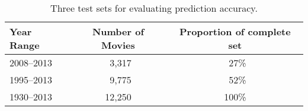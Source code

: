 \begin{table}[!ht]
\centering
\caption{\label{tab:test_sets}Three test sets for evaluating prediction accuracy.}
\begin{tabular}{@{}lcc@{}}
\toprule
Year Range & Number of Movies & Proportion of complete set \\
\midrule
2008--2013     &~3,317 &~27\% \\
1995--2013     &~9,775 &~52\% \\
1930--2013     &12,250 &100\% \\
\bottomrule
\end{tabular}
\end{table}
